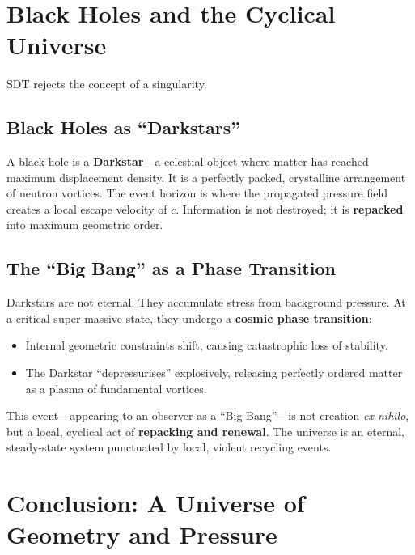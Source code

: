 \section{Black Holes and the Cyclical Universe}

SDT rejects the concept of a singularity.

\subsection{Black Holes as ``Darkstars''}

A black hole is a \textbf{Darkstar}---a celestial object where matter has reached maximum displacement density.  It is a perfectly packed, crystalline arrangement of neutron vortices.  The event horizon is where the propagated pressure field creates a local escape velocity of $c$.  Information is not destroyed; it is \textbf{repacked} into maximum geometric order.

\subsection{The ``Big Bang'' as a Phase Transition}

Darkstars are not eternal.  They accumulate stress from background pressure.  At a critical super-massive state, they undergo a \textbf{cosmic phase transition}:
\begin{itemize}
  \item Internal geometric constraints shift, causing catastrophic loss of stability.
  \item The Darkstar ``depressurises'' explosively, releasing perfectly ordered matter as a plasma of fundamental vortices.
\end{itemize}

This event---appearing to an observer as a ``Big Bang''---is not creation \emph{ex nihilo}, but a local, cyclical act of \textbf{repacking and renewal}.  The universe is an eternal, steady-state system punctuated by local, violent recycling events.


\section{Conclusion: A Universe of Geometry and Pressure}

